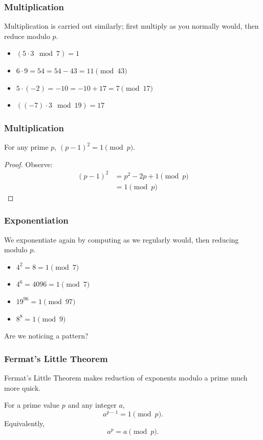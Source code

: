 \documentclass{beamer}
\newcommand{\<}{\langle}
\renewcommand{\>}{\rangle}
\begin{document}
\begin{frame}
\frametitle{Multiplication}

Multiplication is carried out similarly; first multiply as you normally would, then reduce modulo $p$.
\begin{itemize}
\item $(5\cdot 3 \mod 7) = 1$
\item $6\cdot 9 = 54 = 54 - 43 = 11 \pmod{43}$
\item $5\cdot(-2) = -10 = -10 + 17 = 7\pmod{17}$
\item $((-7)\cdot 3 \mod{19}) = 17$
\end{itemize}
\end{frame}

\begin{frame}
\frametitle{Multiplication}

\begin{theorem}
For any prime $p$, $(p-1)^2 = 1\pmod p$.
\end{theorem}
\begin{proof}
Observe:
\begin{align*}
(p-1)^2 &= p^2 -2p + 1 \pmod p\\
	&= 1 \pmod p
\end{align*}
\end{proof}
\end{frame}


\begin{frame}
\frametitle{Exponentiation}

We exponentiate again by computing as we regularly would, then reducing modulo $p$.
\begin{itemize}
\item $4^2 = 8 = 1 \pmod 7$
\item $4^6 = 4096 = 1 \pmod 7$
\item $19^96 = 1 \pmod{97}$
\item $8^8 = 1 \pmod 9$
\end{itemize}
Are we noticing a pattern?
\end{frame}

\begin{frame}
\frametitle{Fermat's Little Theorem}

Fermat's Little Theorem makes reduction of exponents modulo a prime much more quick.

\begin{theorem}
For a prime value $p$ and any integer $a$, 
\[
a^{p-1} = 1 \pmod p.
\]
Equivalently,
\[
a^p = a \pmod p.
\]
\end{theorem}
\end{frame}
\end{document}
